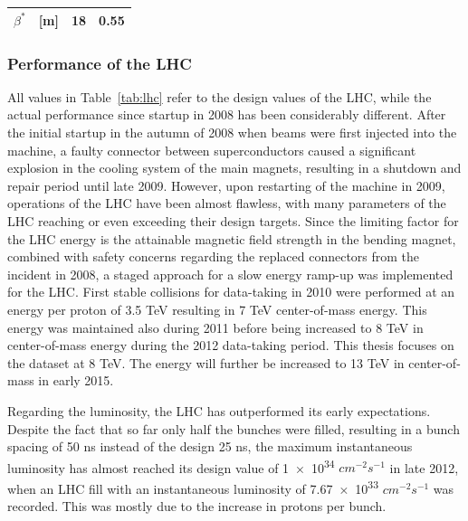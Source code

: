 \begin{table}
\begin{center}
\begin{tabular}{ r l | c | c }
    $\beta^*$                                                   & [m]          & 18                                           & 0.55 \\        \hline %
    \hline
    \end{tabular}
    \end{center}
\end{table}

\subsubsection*{Performance of the LHC}
All values in Table~\ref{tab:lhc} refer to the design values of the LHC, while the actual performance since startup in
2008 has been considerably different. After the initial startup in the autumn of 2008 when beams were first injected 
into the machine, a faulty connector between superconductors caused a significant explosion in the cooling system of the main magnets, resulting
in a shutdown and repair period until late 2009. However, upon restarting of the machine in 2009, operations of
the LHC have been almost flawless, with many parameters of the LHC reaching or even exceeding their design targets.
Since the limiting factor for the LHC energy is the attainable magnetic field strength in the bending magnet, combined with 
safety concerns regarding the replaced connectors from the incident in 2008, a staged approach for a slow energy ramp-up
was implemented for the LHC. First stable collisions for data-taking in 2010 were performed at an energy per proton
of 3.5 TeV resulting in 7 TeV center-of-mass energy. This energy was maintained also during 2011 before being increased
to 8 TeV in center-of-mass energy during the 2012 data-taking period. This thesis focuses on the dataset at 8 TeV.
The energy will further be increased to 13 TeV in center-of-mass in early 2015.

Regarding the luminosity, the LHC has outperformed its early expectations. Despite the fact that so far only
half the bunches were filled, resulting in a bunch spacing of 50 ns instead of the design 25 ns, the maximum
instantaneous luminosity has almost reached its design value of \num{1e34} $cm^{-2}s^{-1}$ in late 2012, when 
an LHC fill with an instantaneous luminosity of \num{7.67e33} $cm^{-2}s^{-1}$ was recorded. This was mostly
due to the increase in protons per bunch.



